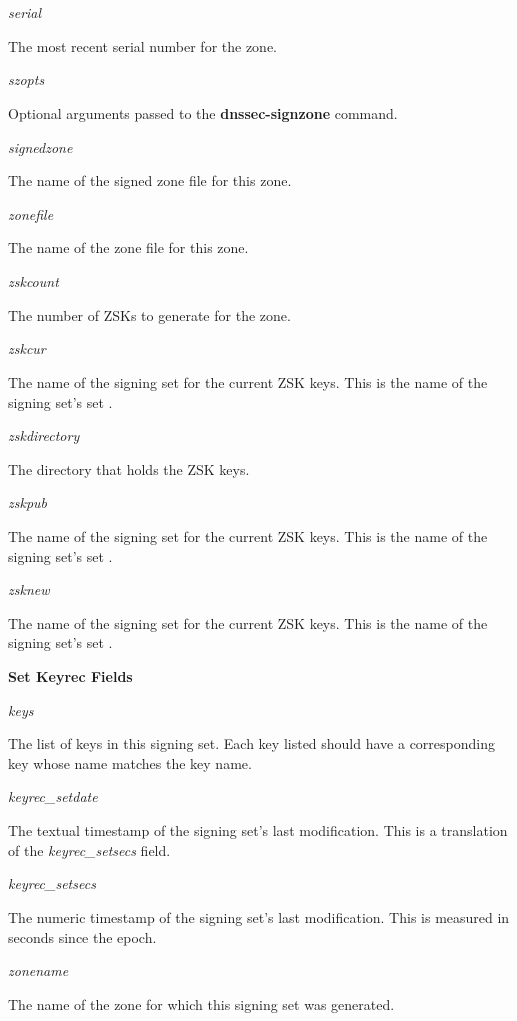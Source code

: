 \begin{description}
\item {\it serial}\verb" "

The most recent serial number for the zone.

\item {\it szopts}\verb" "

Optional arguments passed to the {\bf dnssec-signzone} command.

\item {\it signedzone}\verb" "

The name of the signed zone file for this zone.

\item {\it zonefile}\verb" "

The name of the zone file for this zone.

\item {\it zskcount}\verb" "

The number of ZSKs to generate for the zone.

\item {\it zskcur}\verb" "

The name of the signing set for the current ZSK keys.
This is the name of the signing set's set .

\item {\it zskdirectory}\verb" "

The directory that holds the ZSK keys.

\item {\it zskpub}\verb" "

The name of the signing set for the current ZSK keys.
This is the name of the signing set's set .

\item {\it zsknew}\verb" "

\end{description}

The name of the signing set for the current ZSK keys.
This is the name of the signing set's set .

{\bf Set Keyrec Fields}

\begin{description}

\item {\it keys}\verb" "

The list of keys in this signing set.  Each key listed should have a
corresponding key  whose name matches the key name.

\item {\it keyrec\_setdate}\verb" "

The textual timestamp of the signing set's last modification.
This is a translation of the {\it keyrec\_setsecs} field.

\item {\it keyrec\_setsecs}\verb" "

The numeric timestamp of the signing set's last modification.
This is measured in seconds since the epoch.

\item {\it zonename}\verb" "

The name of the zone for which this signing set was generated.

\end{description}


